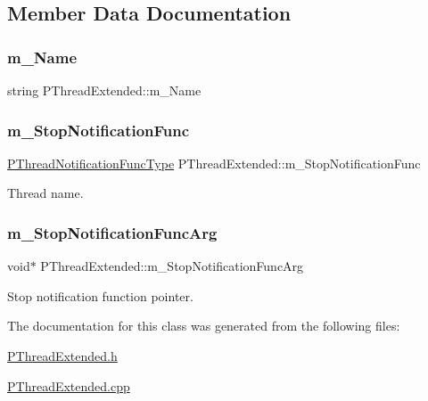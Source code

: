 \subsection{Member Data Documentation}
\mbox{\label{classPThreadExtended_a43d72651db43fda0d627e87ca2a71ba3}} 
\subsubsection{\texorpdfstring{m\+\_\+\+Name}{m\_Name}}
{\footnotesize\ttfamily string P\+Thread\+Extended\+::m\+\_\+\+Name\hspace{0.3cm}{\ttfamily [private]}}

\mbox{\label{classPThreadExtended_ae922e8bf6a63ea08521785c1875e02e2}} 
\subsubsection{\texorpdfstring{m\+\_\+\+Stop\+Notification\+Func}{m\_StopNotificationFunc}}
{\footnotesize\ttfamily \hyperlink{group__FUNC__DEFS_ga164076b53d35e4dba4c51bb336c15dab}{P\+Thread\+Notification\+Func\+Type} P\+Thread\+Extended\+::m\+\_\+\+Stop\+Notification\+Func\hspace{0.3cm}{\ttfamily [private]}}



Thread name. 

\mbox{\label{classPThreadExtended_a666cf4f4189eb9dc04b2aa42da0f4acd}} 
\subsubsection{\texorpdfstring{m\+\_\+\+Stop\+Notification\+Func\+Arg}{m\_StopNotificationFuncArg}}
{\footnotesize\ttfamily void$\ast$ P\+Thread\+Extended\+::m\+\_\+\+Stop\+Notification\+Func\+Arg\hspace{0.3cm}{\ttfamily [private]}}



Stop notification function pointer. 



The documentation for this class was generated from the following files\+:\begin{DoxyCompactItemize}
\item 
\hyperlink{PThreadExtended_8h}{P\+Thread\+Extended.\+h}\item 
\hyperlink{PThreadExtended_8cpp}{P\+Thread\+Extended.\+cpp}\end{DoxyCompactItemize}
